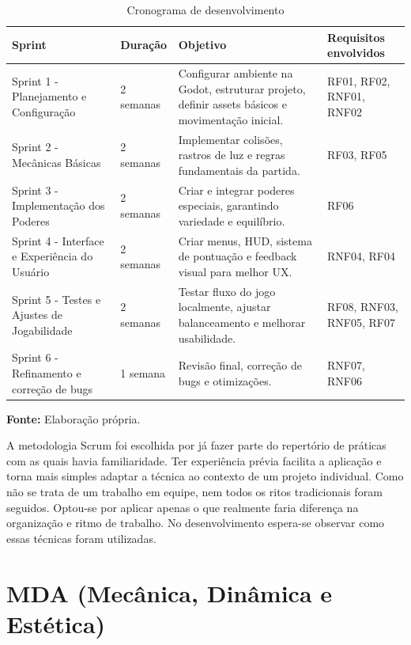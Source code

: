 \begin{table}[H]
\centering
\caption{Cronograma de desenvolvimento}
\label{tab:cronograma}
\begin{tabular}{|p{4cm}|p{2.5cm}|p{5.5cm}|p{3cm}|}
\hline
\textbf{Sprint} & \textbf{Duração} & \textbf{Objetivo} & \textbf{Requisitos envolvidos} \\
\hline
Sprint 1 - Planejamento e Configuração & 2 semanas & Configurar ambiente na Godot, estruturar projeto, definir assets básicos e movimentação inicial. & RF01, RF02, RNF01, RNF02 \\
\hline
Sprint 2 - Mecânicas Básicas & 2 semanas & Implementar colisões, rastros de luz e regras fundamentais da partida. & RF03, RF05 \\
\hline
Sprint 3 - Implementação dos Poderes & 2 semanas & Criar e integrar poderes especiais, garantindo variedade e equilíbrio. & RF06 \\
\hline
Sprint 4 - Interface e Experiência do Usuário & 2 semanas & Criar menus, HUD, sistema de pontuação e feedback visual para melhor UX. & RNF04, RF04 \\
\hline
Sprint 5 - Testes e Ajustes de Jogabilidade & 2 semanas & Testar fluxo do jogo localmente, ajustar balanceamento e melhorar usabilidade. & RF08, RNF03, RNF05, RF07 \\
\hline
Sprint 6 - Refinamento e correção de bugs & 1 semana & Revisão final, correção de bugs e otimizações. & RNF07, RNF06 \\
\hline
\end{tabular}

\vspace{0.3em}
\small \textbf{Fonte:} Elaboração própria.

\end{table}

A metodologia Scrum foi escolhida por já fazer parte do repertório de práticas com as quais havia familiaridade. Ter experiência prévia facilita a aplicação e torna mais simples adaptar a técnica ao contexto de um projeto individual. Como não se trata de um trabalho em equipe, nem todos os ritos tradicionais foram seguidos. Optou-se por aplicar apenas o que realmente faria diferença na organização e ritmo de trabalho. No desenvolvimento espera-se observar como essas técnicas foram utilizadas.


\section{MDA (Mecânica, Dinâmica e Estética)}

